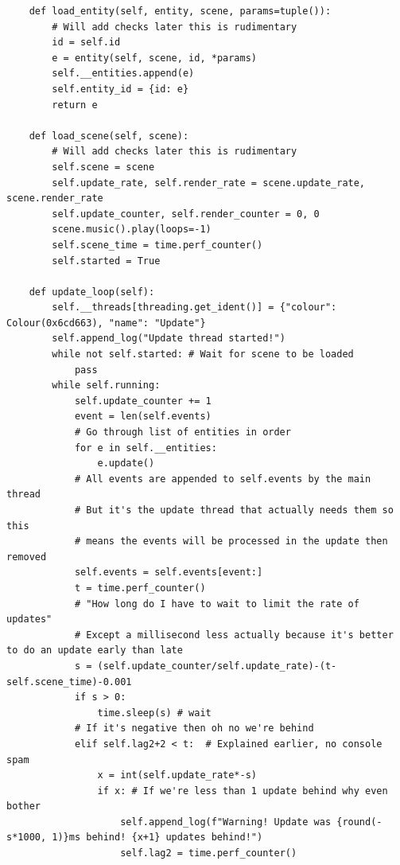 \documentclass{report}
\begin{document}
\begin{verbatim}
    def load_entity(self, entity, scene, params=tuple()):
        # Will add checks later this is rudimentary
        id = self.id
        e = entity(self, scene, id, *params)
        self.__entities.append(e)
        self.entity_id = {id: e}
        return e

    def load_scene(self, scene):
        # Will add checks later this is rudimentary
        self.scene = scene
        self.update_rate, self.render_rate = scene.update_rate, scene.render_rate
        self.update_counter, self.render_counter = 0, 0
        scene.music().play(loops=-1)
        self.scene_time = time.perf_counter()
        self.started = True

    def update_loop(self):
        self.__threads[threading.get_ident()] = {"colour": Colour(0x6cd663), "name": "Update"}
        self.append_log("Update thread started!")
        while not self.started: # Wait for scene to be loaded
            pass
        while self.running:
            self.update_counter += 1
            event = len(self.events)
            # Go through list of entities in order
            for e in self.__entities:
                e.update()
            # All events are appended to self.events by the main thread
            # But it's the update thread that actually needs them so this
            # means the events will be processed in the update then removed
            self.events = self.events[event:]
            t = time.perf_counter()
            # "How long do I have to wait to limit the rate of updates"
            # Except a millisecond less actually because it's better to do an update early than late
            s = (self.update_counter/self.update_rate)-(t-self.scene_time)-0.001
            if s > 0:
                time.sleep(s) # wait
            # If it's negative then oh no we're behind
            elif self.lag2+2 < t:  # Explained earlier, no console spam
                x = int(self.update_rate*-s)
                if x: # If we're less than 1 update behind why even bother
                    self.append_log(f"Warning! Update was {round(-s*1000, 1)}ms behind! {x+1} updates behind!")
                    self.lag2 = time.perf_counter()



\end{verbatim}
\end{document}
